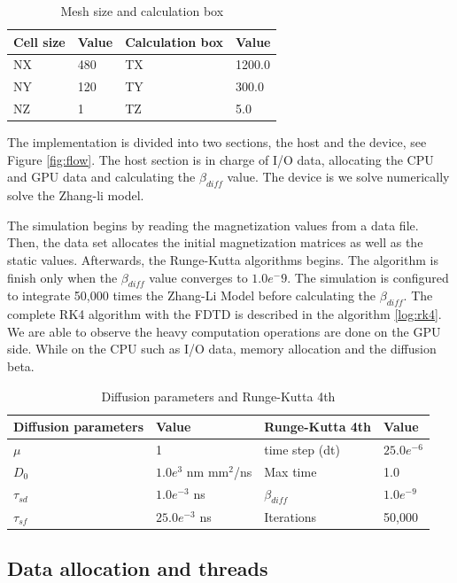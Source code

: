 \begin{table}[h]
\centering
\begin{tabular}{| l | l | l | l |}
\hline
Cell size & Value & Calculation box & Value \\
\hline
 NX & 480 &  TX  & 1200.0   \\
\hline
 NY & 120 &  TY  & 300.0  \\
\hline
 NZ &	1 &  TZ  & 5.0   \\
\hline
\end{tabular}
\caption{Mesh size and calculation box}
\label{tab:mesh}
\end{table}

The implementation is divided into two sections, the host and the device, see Figure \ref{fig:flow}. The host section is in charge of I/O data, allocating the CPU and GPU data and calculating the $\beta_{diff}$ value. The device is we solve numerically solve the Zhang-li model.

The simulation begins by reading the magnetization values from a data file. Then, the data set allocates the initial magnetization matrices as well as the static values. Afterwards, the Runge-Kutta algorithms begins. The algorithm is finish only when the $\beta_{diff}$ value converges to $1.0e^-9$. The simulation is configured to integrate 50,000 times the Zhang-Li Model before calculating the $\beta_{diff}$. The complete RK4 algorithm with the FDTD is described in the algorithm \ref{log:rk4}. We are able to observe the heavy computation operations are done on the GPU side. While on the CPU such as I/O data, memory allocation and the diffusion beta.

\begin{table}[h]
\centering
\begin{tabular}{| l | l | l | l |}
\hline
Diffusion parameters& Value & Runge-Kutta 4th & Value \\
\hline 
$\mu$ & 1 &  time step (dt) &   $25.0e^{-6}$   \\
\hline
$D_{0}$ & $1.0e^{3}$ nm mm$^2$/ns  & Max time  & 1.0  \\
\hline
$\tau_{sd}$ & $1.0e^{-3}$ ns  & $\beta_{diff}$ & $1.0e^{-9}$ \\
\hline
$\tau_{sf}$ & $25.0e^{-3}$ ns  & Iterations & 50,000 \\
\hline
\end{tabular}
\caption{Diffusion parameters and Runge-Kutta 4th}
\label{tab:drk}
\end{table}

\subsection{Data allocation and threads}

